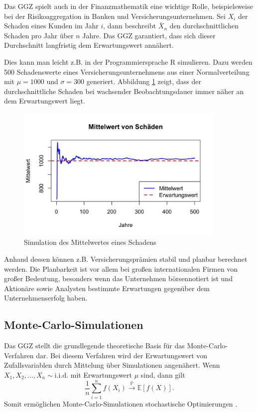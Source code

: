 \documentclass[aodsor,preprint]{imsart}
\numberwithin{equation}{section}
\theoremstyle{plain}
\begin{document}
Das GGZ spielt auch in der Finanzmathematik eine wichtige Rolle, beispielsweise bei der Risikoaggregation in Banken und Versicherungsunternehmen. Sei \( X_i \) der Schaden eines Kunden im Jahr \( i \), dann beschreibt \( \bar{X}_n \) den durchschnittlichen Schaden pro Jahr über \( n \) Jahre. Das GGZ garantiert, dass sich dieser Durchschnitt langfristig dem Erwartungswert annähert.

Dies kann man leicht z.B. in der Programmiersprache R simulieren.
Dazu werden 500 Schadenswerte eines Versicherungsunternehmens aus einer Normalverteilung mit \( \mu = 1000 \) und \( \sigma = 300 \) generiert.
Abbildung \ref{fig:schaden} zeigt, dass der durchschnittliche Schaden bei wachsender Beobachtungsdauer immer näher an dem Erwartungswert liegt.

\begin{figure}[h!]
  \centering
  \includegraphics[width=0.9\textwidth]{schaden.png}
  \caption{Simulation des Mittelwertes eines Schadens}
  \label{fig:schaden}
\end{figure}

Anhand dessen können z.B. Versicherungsprämien stabil und planbar berechnet werden. Die Planbarkeit ist vor allem bei großen internationalen Firmen von großer Bedeutung, besonders wenn das Unternehmen börsennotiert ist und Aktionäre sowie Analysten bestimmte Erwartungen gegenüber dem Unternehmenserfolg haben.


\subsection{Monte-Carlo-Simulationen}

Das GGZ stellt die grundlegende theoretische Basis für das Monte-Carlo-Verfahren dar.
Bei diesem Verfahren wird der Erwartungswert von Zufallsvariablen durch Mittelung über Simulationen angenähert.
Wenn \( X_1, X_2, \dots, X_n \sim \text{i.i.d.} \) mit Erwartungswert \( \mu \) sind, dann gilt
\[
\frac{1}{n} \sum_{i=1}^n f(X_i) \xrightarrow{\mathbb{P}} \mathbb{E}[f(X)].
\]
Somit ermöglichen Monte-Carlo-Simulationen stochastische Optimierungen  \citep{degroot2021}.
\end{document}
